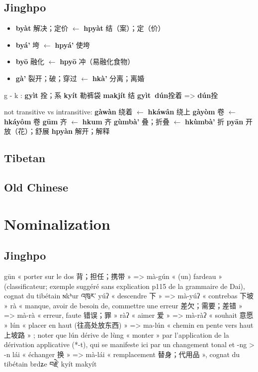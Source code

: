 \documentclass[oneside,a4paper,11pt]{article}
\newcommand{\ipa}[1]{\textbf{{\phon\mbox{#1}}}} %
\newcommand{\zh}[1]{{\cn #1}}
\begin{document}
 \subsection{Jinghpo}
 \citet[78]{dai92yufa}
\begin{itemize}
\item \ipa{byàt} \zh{解决；定价} $\leftarrow$ \ipa{hpyàt} \zh{结（案）；定（价）}
\item \ipa{byá'} \zh{垮} $\leftarrow$ \ipa{hpyá'} \zh{使垮} %
\item \ipa{byō} \zh{融化} $\leftarrow$ \ipa{hpyō} \zh{冲（易融化食物）} 
\item \ipa{gà'} \zh{裂开；破；穿过} $\leftarrow$ \ipa{hkà'} \zh{分离；离婚} 
\end{itemize}

g - k : 
  \ipa{gyìt} \zh{拴；系}  \ipa{kyít}   \zh{勒裤袋}
  \ipa{makjít} \zh{结} 
    \ipa{gyìt dún}\zh{拴着} =>  \ipa{dún}\zh{拴}

not transitive vs intransitive:
 \ipa{gàwàn} \zh{绕着} $\leftarrow$ \ipa{hkáwân} \zh{绕上} %
 \ipa{gàyòm} \zh{卷} $\leftarrow$ \ipa{hkáyôm} \zh{卷} %
 \ipa{gūm} \zh{齐} $\leftarrow$ \ipa{hkum} \zh{齐} %
  \ipa{gùmbà'} \zh{叠；折叠} $\leftarrow$ \ipa{hkùmbà'} \zh{折} 
\ipa{pyān} \zh{开放（花）；舒展}  \ipa{hpyàn} \zh{解开；解释} %

\subsection{Tibetan}
\subsection{Old Chinese}
\section{Nominalization}
\subsection{Jinghpo}

 \citet[4]{dai92yufa}
gūn « porter sur le dos 背；担任；携带 » => mà-gún « (un) fardeau » (classificateur; exemple suggéré sans explication p115 de la grammaire de Dai), cognat du tibétain ɴkʰur འཁུར་
yúʔ « descendre 下 » => mà-yúʔ « contrebas 下坡 »
rà « manque, avoir de besoin de, commettre une erreur 差欠；需要；差错 » => mà-rà « erreur, faute 错误；罪 »
ràʔ « aimer 爱 » => mà-ràʔ « souhait 意愿 »
lún « placer en haut (往高处放东西) » => ma-lún « chemin en pente vers haut 上坡路 » ; noter que lún dérive de lùng « monter » par l’application de la dérivation applicative (*-t), qui se manifeste ici par un changement tonal et -ng > -n
lái « échanger 换 » => mà-lái « remplacement 替身；代用品 », cognat du tibétain brdʑe བརྗེ་
kyít makyít
\end{document}

